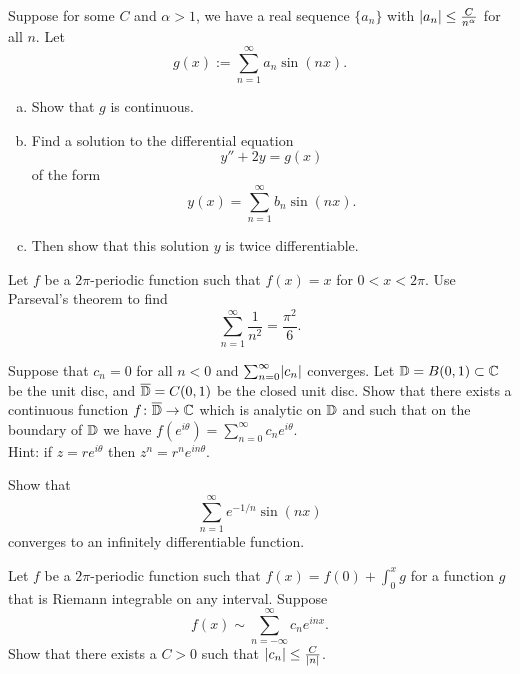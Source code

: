 \begin{exercise}
Suppose for some $C$ and $\alpha > 1$, we have
a real sequence $\{ a_n \}$ with
$\left\lvert {a_n} \right\rvert \leq \frac{C}{n^\alpha}$ for all $n$.
Let
\begin{equation*}
g(x) := \sum_{n=1}^\infty a_n \sin(n x) .
\end{equation*}
\begin{enumerate}[a)]
\item
Show that $g$ is continuous.
\item
Find a solution to the differential equation
\begin{equation*}
y''+ 2 y = g(x)
\end{equation*}
of the form
\begin{equation*}
y(x) = \sum_{n=1}^\infty b_n \sin(n x) .
\end{equation*}
\item
Then show that this solution $y$ is twice differentiable.
\end{enumerate}
\end{exercise}

\begin{exercise}
Let $f$ be a $2\pi$-periodic  function such
that $f(x) = x$ for $0 < x < 2\pi$.
Use Parseval's theorem to find
\begin{equation*}
\sum_{n=1}^\infty \frac{1}{n^2} = \frac{\pi^2}{6} .
\end{equation*}
\end{exercise}

\begin{exercise}
Suppose that $c_n = 0$ for all $n < 0$ and $\sum_{n=0}^\infty \lvert {c_n} \rvert$
converges.  Let ${\mathbb{D}} = B(0,1) \subset {\mathbb{C}}$ be the unit disc,
and $\overline{{\mathbb{D}}} = C(0,1)$ be the closed unit disc.
Show that there exists a continuous function
$f \colon \overline{{\mathbb{D}}} \to {\mathbb{C}}$ which is analytic on ${\mathbb{D}}$
and such that on the boundary of ${\mathbb{D}}$ we have
$f(e^{i\theta}) = \sum_{n=0}^\infty c_n e^{i\theta}$.\\
Hint: if $z=re^{i\theta}$ then $z^n = r^n e^{in\theta}$.
\end{exercise}

\begin{exercise}
Show that
\begin{equation*}
\sum_{n=1}^\infty e^{-1/n} \sin(n x)
\end{equation*}
converges to an infinitely differentiable function.
\end{exercise}

\begin{exercise}
Let $f$ be a $2\pi$-periodic function
such that $f(x) = f(0) + \int_0^x g$
for a function $g$ that is Riemann integrable on any interval.
Suppose
\begin{equation*}
f(x) \sim
\sum_{n=-\infty}^\infty c_n e^{inx} .
\end{equation*}
Show that there exists a $C > 0$ such that
$\lvert {c_n} \rvert \leq \frac{C}{\lvert {n} \rvert}$.
\end{exercise}

